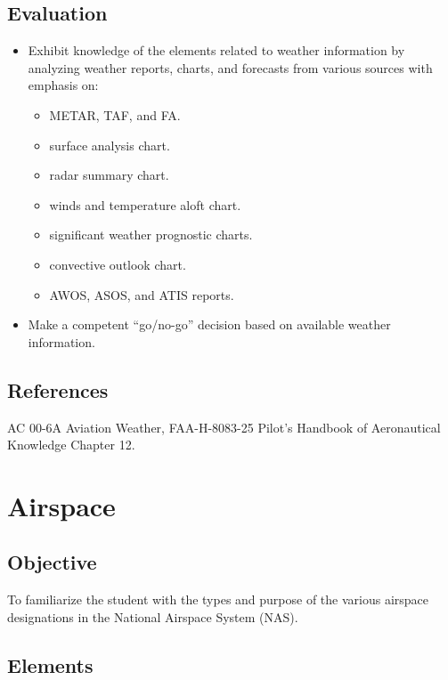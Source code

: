 \documentclass[twoside,openright]{report}
\begin{document}
\section{Evaluation}

\begin{itemize}
  \item Exhibit knowledge of the elements related to weather information by
    analyzing weather reports, charts, and forecasts from various sources with
    emphasis on:
    \begin{itemize}
      \item METAR, TAF, and FA.
      \item surface analysis chart.
      \item radar summary chart.
      \item winds and temperature aloft chart.
      \item significant weather prognostic charts.
      \item convective outlook chart.
      \item AWOS, ASOS, and ATIS reports.
    \end{itemize}
  \item Make a competent ``go/no-go'' decision based on available weather information.
\end{itemize}

\section{References}

AC 00-6A Aviation Weather, FAA-H-8083-25 Pilot's Handbook of Aeronautical
Knowledge Chapter 12.

\chapter{Airspace}

\section{Objective}

To familiarize the student with the types and purpose of the various airspace
designations in the National Airspace System (NAS).

\section{Elements}
\end{document}
